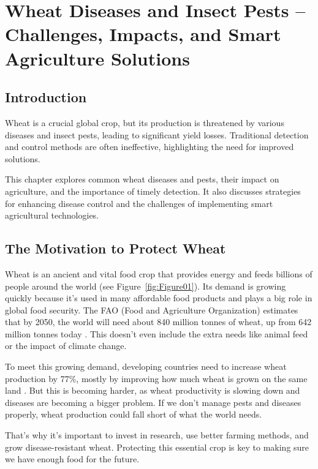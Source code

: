 \chapter{Wheat Diseases and Insect Pests – Challenges, Impacts, and Smart Agriculture Solutions}

\section{Introduction}

Wheat is a crucial global crop, but its production is threatened by various diseases and insect pests, leading to significant yield losses. Traditional detection and control methods are often ineffective, highlighting the need for improved solutions. 

This chapter explores common wheat diseases and pests, their impact on agriculture, and the importance of timely detection. It also discusses strategies for enhancing disease control and the challenges of implementing smart agricultural technologies.



\section{The Motivation to Protect Wheat}

Wheat is an ancient and vital food crop that provides energy and feeds billions of people around the world (see Figure~\ref{fig:Figure01}). Its demand is growing quickly because it’s used in many affordable food products and plays a big role in global food security. The FAO (Food and Agriculture Organization) estimates that by 2050, the world will need about 840 million tonnes of wheat, up from 642 million tonnes today \parencite{sharma2015wheat}. This doesn’t even include the extra needs like animal feed or the impact of climate change.

To meet this growing demand, developing countries need to increase wheat production by 77\%, mostly by improving how much wheat is grown on the same land \parencite{sharma2015wheat}. But this is becoming harder, as wheat productivity is slowing down and diseases are becoming a bigger problem. If we don’t manage pests and diseases properly, wheat production could fall short of what the world needs.

That’s why it's important to invest in research, use better farming methods, and grow disease-resistant wheat. Protecting this essential crop is key to making sure we have enough food for the future.


